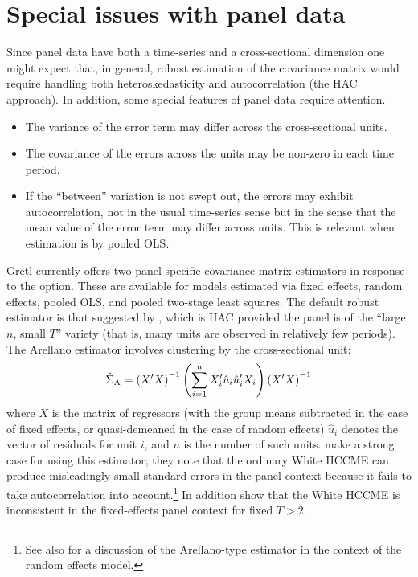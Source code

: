 \section{Special issues with panel data}
\label{sec:vcv-panel}

Since panel data have both a time-series and a cross-sectional
dimension one might expect that, in general, robust estimation of the
covariance matrix would require handling both heteroskedasticity and
autocorrelation (the HAC approach).  In addition, some special features of
panel data require attention.
\begin{itemize}
\item The variance of the error term may differ across the
  cross-sectional units.
\item The covariance of the errors across the units may be non-zero in
  each time period.
\item If the ``between'' variation is not swept out, the errors may
  exhibit autocorrelation, not in the usual time-series sense but in
  the sense that the mean value of the error term may differ across
  units.  This is relevant when estimation is by pooled OLS.
\end{itemize}

Gretl currently offers two panel-specific covariance matrix estimators
in response to the  option. These are available for
models estimated via fixed effects, random effects, pooled OLS, and
pooled two-stage least squares.  The default robust estimator is that
suggested by \cite{arellano03}, which is HAC provided the panel is of
the ``large $n$, small $T$'' variety (that is, many units are observed
in relatively few periods).  The Arellano estimator involves
clustering by the cross-sectional unit:
\[
\hat{\Sigma}_{\rm A} = 
\left(X^{\prime}X\right)^{-1}
\left( \sum_{i=1}^n X_i^{\prime} \hat{u}_i 
    \hat{u}_i^{\prime} X_i \right)
\left(X^{\prime}X\right)^{-1}
\]
where $X$ is the matrix of regressors (with the group means subtracted
in the case of fixed effects, or quasi-demeaned in the case of random
effects) $\hat{u}_i$ denotes the vector of residuals for unit $i$, and
$n$ is the number of such units.  \cite{cameron-trivedi05} make a
strong case for using this estimator; they note that the ordinary
White HCCME can produce misleadingly small standard errors in the
panel context because it fails to take autocorrelation into
account.\footnote{See also \cite{cameron-miller15} for a discussion of
  the Arellano-type estimator in the context of the random effects
  model.}  In addition \cite{stock-watson08} show that the White HCCME
is inconsistent in the fixed-effects panel context for fixed $T > 2$.

